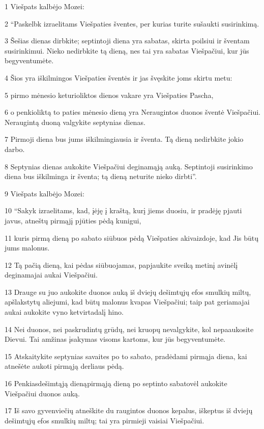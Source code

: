\par 1 Viešpats kalbėjo Mozei: 
\par 2 “Paskelbk izraelitams Viešpaties šventes, per kurias turite sušaukti susirinkimą. 
\par 3 Šešias dienas dirbkite; septintoji diena yra sabatas, skirta poilsiui ir šventam susirinkimui. Nieko nedirbkite tą dieną, nes tai yra sabatas Viešpačiui, kur jūs begyventumėte. 
\par 4 Šios yra iškilmingos Viešpaties šventės ir jas švęskite joms skirtu metu: 
\par 5 pirmo mėnesio keturioliktos dienos vakare yra Viešpaties Pascha, 
\par 6 o penkioliktą to paties mėnesio dieną yra Neraugintos duonos šventė Viešpačiui. Neraugintą duoną valgykite septynias dienas. 
\par 7 Pirmoji diena bus jums iškilmingiausia ir šventa. Tą dieną nedirbkite jokio darbo. 
\par 8 Septynias dienas aukokite Viešpačiui deginamąją auką. Septintoji susirinkimo diena bus iškilminga ir šventa; tą dieną neturite nieko dirbti”. 
\par 9 Viešpats kalbėjo Mozei: 
\par 10 “Sakyk izraelitams, kad, įėję į kraštą, kurį jiems duosiu, ir pradėję pjauti javus, atneštų pirmąjį pjūties pėdą kunigui, 
\par 11 kuris pirmą dieną po sabato siūbuos pėdą Viešpaties akivaizdoje, kad Jis būtų jums malonus. 
\par 12 Tą pačią dieną, kai pėdas siūbuojamas, papjaukite sveiką metinį avinėlį deginamajai aukai Viešpačiui. 
\par 13 Drauge su juo aukokite duonos auką iš dviejų dešimtųjų efos smulkių miltų, apšlakstytų aliejumi, kad būtų malonus kvapas Viešpačiui; taip pat geriamajai aukai aukokite vyno ketvirtadalį hino. 
\par 14 Nei duonos, nei paskrudintų grūdų, nei kruopų nevalgykite, kol nepaaukosite Dievui. Tai amžinas įsakymas visoms kartoms, kur jūs begyventumėte. 
\par 15 Atskaitykite septynias savaites po to sabato, pradėdami pirmąja diena, kai atnešėte aukoti pirmąją derliaus pėdą. 
\par 16 Penkiasdešimtąją dieną­pirmąją dieną po septinto sabato­vėl aukokite Viešpačiui duonos auką. 
\par 17 Iš savo gyvenviečių atneškite du raugintos duonos kepalus, iškeptus iš dviejų dešimtųjų efos smulkių miltų; tai yra pirmieji vaisiai Viešpačiui. 
